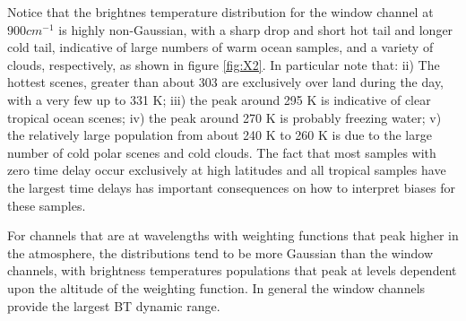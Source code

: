 \documentclass[twocolumn,10pt]{article}
\begin{document}

Notice that the brightnes temperature distribution for the window channel at $900 cm^{-1}$ is highly non-Gaussian, with a sharp drop and short hot tail and longer cold tail, indicative of large numbers of warm ocean samples, and a variety of clouds, respectively, as shown in figure \ref{fig:X2}. In particular note that: 
ii) The hottest scenes, greater than about 303 are exclusively over land during the day, with a very few up to 331 K; 
iii) the peak around 295 K is indicative of clear tropical ocean scenes; 
iv) the peak around 270 K is probably freezing water; 
v) the relatively large population from about 240 K to 260 K is due to the large number of cold polar scenes and cold clouds. The fact that most samples with zero time delay occur exclusively at high latitudes and all tropical samples have the largest time delays has important consequences on how to interpret biases for these samples.

For channels that are at wavelengths with weighting functions that peak higher in the atmosphere, the distributions tend to be more Gaussian than the window channels, with brightness temperatures populations that peak at levels dependent upon the altitude of the weighting function. In general the window channels provide the largest BT dynamic range.



\end{document}
